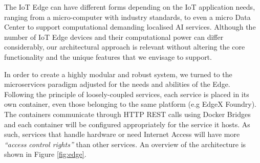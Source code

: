 The IoT Edge can have different forms depending on the IoT application needs, ranging from a micro-computer with industry standards, to even a micro Data Center to support computational demanding localised AI services. Although the number of IoT Edge devices and their computational power can differ considerably, our architectural approach is relevant without altering the core functionality and the unique features that we envisage to support.
 
In order to create a highly modular and robust system, we turned to the microservices paradigm adjusted for the needs and abilities of the Edge. Following the principle of loosely-coupled services, each service is placed in its own container, even those belonging to the same platform (e.g EdgeX Foundry). The containers communicate through HTTP REST calls using Docker Bridges and each container will be configured appropriately for the service it hosts. As such, services that handle hardware or need Internet Access will have more \textit{“access control rights”} than other services. An overview of the architecture is shown in Figure \ref{fig:edge}.

